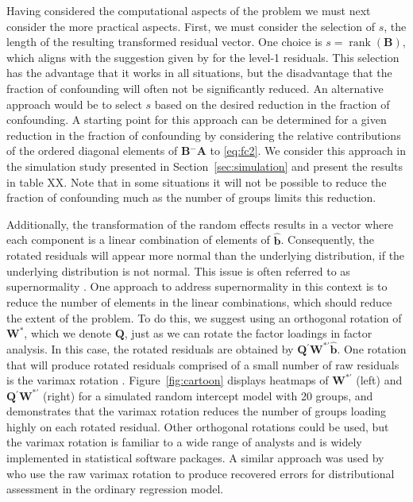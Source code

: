 \documentclass{article} %
\newcommand{\al}[1]{{\color{red} #1}}
\newcommand{\ginv}{\ensuremath{^{-}}}
\newcommand{\trans}{\ensuremath{^\prime}}
\DeclareMathOperator{\rank}{rank}
\begin{document}
Having considered the computational aspects of the problem we must next consider the more practical aspects. First, we must consider the selection of $s$,  the length of the resulting transformed residual vector. One choice is $s = \rank(\bm{B})$, which aligns with the suggestion given by \cite{HildenMinton:1995wh} for the level-1 residuals. This selection has the advantage that it works in all situations, but the disadvantage that the fraction of confounding will \al{often} not be \al{significantly} reduced. An alternative approach would be to select $s$ based on the desired reduction in the fraction of confounding. A starting point for this approach can be determined for a given reduction in the fraction of confounding by considering the relative contributions of the ordered diagonal elements of $\bm{B}\ginv\bm{A}$ to \eqref{eq:fc2}. We consider this approach in the simulation study presented in Section~\ref{sec:simulation} and present the results in table XX. Note that in some situations it will not be possible to reduce the fraction of confounding much as the number of groups limits this reduction.

Additionally, the transformation of the random effects results in a vector where each component is a linear combination of elements of $\widehat{\bm{b}}$. Consequently, the rotated residuals will appear more normal than the underlying distribution, if the underlying distribution is not normal. This issue is often referred to as supernormality \citep{Atkinson:1985}. One approach to address supernormality in this context is to reduce the number of elements in the linear combinations, which should reduce the extent of the problem. To do this, we suggest using an orthogonal rotation of $\bm{W}^*$, which we denote $\bm{Q}$, just as we can rotate the factor loadings in factor analysis. In this case, the rotated residuals are obtained by $\bm{Q}\trans \bm{W}^{*\prime} \widehat{\bm{b}}$. One rotation that will produce rotated residuals comprised of a small number of raw residuals is the varimax rotation \citep{Johnson:2007}. Figure~\ref{fig:cartoon} displays heatmaps of $\bm{W}^{*\prime}$ (left) and $\bm{Q}\trans\bm{W}^{*\prime}$ (right) for a simulated random intercept model with 20 groups, and demonstrates that the varimax rotation reduces the number of groups loading highly on each rotated residual.  Other orthogonal rotations could be used, but the varimax rotation is familiar to a wide range of analysts and is widely implemented in statistical software packages. A similar approach was used by \cite{Jensen:1999iu} who use the raw varimax rotation to produce recovered errors for distributional assessment in the ordinary regression model.
\end{document}
